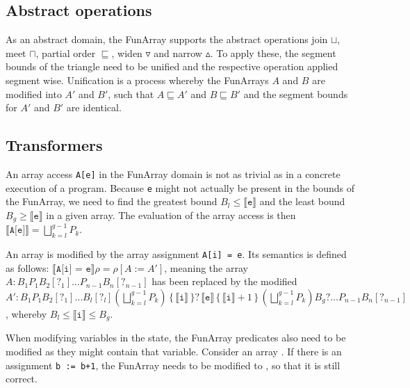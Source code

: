 \subsection{Abstract operations}

As an abstract domain, the FunArray supports the abstract operations join $\sqcup$, meet $\sqcap$, partial order $\sqsubseteq$, widen $\triangledown$ and narrow $\vartriangle$. To apply these, the segment bounds of the triangle need to be unified and the respective operation applied segment wise. Unification is a process whereby the FunArrays $A$ and $B$ are modified into $A'$ and $B'$, such that $A\sqsubseteq A'$ and $B\sqsubseteq B'$ and the segment bounds for $A'$ and $B'$ are identical.


\subsection{Transformers}

An array access \texttt{A[e]} in the FunArray domain is not as trivial as in a concrete execution of a program. Because \texttt{e} might not actually be present in the bounds of the FunArray, we need to find the greatest bound $B_l\leq \llbracket \texttt{e}\rrbracket$ and the least bound $B_g\geq \llbracket \texttt{e}\rrbracket$ in a given array. The evaluation of the array access is then $\llbracket\texttt{A[e]}\rrbracket=\bigsqcup^{g-1}_{k=l}P_k$.

An array is modified by the array assignment \texttt{A[i] = e}. Its semantics is defined as follows: $\llbracket\texttt{A[i] = e}\rrbracket\rho=\rho[A:=A']$, meaning the array $A: B_1P_1B_2[?_1]\ldots P_{n-1}\allowbreak{}B_n[?_{n-1}]$ has been replaced by the modified $A': B_1P_1B_2[?_1]\ldots\allowbreak B_l[?_l] (\bigsqcup^{g-1}_{k=l}P_k)\allowbreak\, \{\,\llbracket\texttt{i}\rrbracket\,\}?\, \llbracket\texttt{e}\rrbracket \allowbreak\,\{\,\llbracket\texttt{i}\rrbracket+1\,\}\, \allowbreak(\bigsqcup^{g-1}_{k=l}P_k) B_g?\ldots \allowbreak P_{n-1}B_n[?_{n-1}]$, whereby $B_l\leq\llbracket\texttt{i}\rrbracket\leq B_g$.

When modifying variables in the state, the FunArray predicates also need to be modified as they might contain that variable. Consider an array . If there is an assignment \texttt{b := b+1}, the FunArray needs to be modified to , so that it is still correct. 















